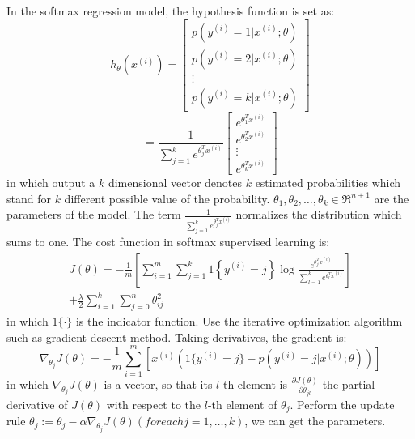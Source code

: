 \documentclass[journal]{IEEEtran}
\begin{document}
In the softmax regression model, the hypothesis function is set as:
\begin{equation}
h_{\theta}(x^{(i)}) = 
\left[
      \begin{array}{cccccc}
        p(y^{(i)}=1|x^{(i)};\theta) \\
        p(y^{(i)}=2|x^{(i)};\theta) \\
        \vdots \\
        p(y^{(i)}=k|x^{(i)};\theta)
      \end{array}
    \right]
\end{equation}
\begin{equation}
= \frac{1}{\sum_{j=1}^ke^{\theta_j^Tx^{(i)}}}
\left[
      \begin{array}{cccccc}
        e^{\theta_1^Tx^{(i)}}\\
        e^{\theta_2^Tx^{(i)}}\\
        \vdots \\
        e^{\theta_k^Tx^{(i)}}
      \end{array}
    \right]
\end{equation}
in which output a $k$ dimensional vector denotes $k$ estimated probabilities which stand for $k$ different possible value of the probability. $\theta_1, \theta_2, \ldots, \theta_k \in \Re^{n+1}$ are the parameters of the model. The term $\frac{1}{ \sum_{j=1}^{k}{e^{ \theta_j^T x^{(i)} }} }$  normalizes the distribution which sums to one. The cost function in softmax supervised learning is:
\begin{equation}
\begin{split}
J(\theta) = - \frac{1}{m} \left[ \sum_{i=1}^{m} \sum_{j=1}^{k} 1\left\{y^{(i)} = j\right\} \log \frac{e^{\theta_j^T x^{(i)}}}{\sum_{l=1}^k e^{ \theta_l^T x^{(i)} }}  \right] \\
              + \frac{\lambda}{2} \sum_{i=1}^k \sum_{j=0}^n \theta_{ij}^2
\end{split}
\end{equation}
in which $1\{\cdot\}$ is the indicator function.
Use the iterative optimization algorithm such as gradient descent method. Taking derivatives, the gradient is:
\begin{equation}
\nabla_{\theta_j} J(\theta) = - \frac{1}{m} \sum_{i=1}^{m}{ [ x^{(i)} ( 1\{ y^{(i)} = j\}  - p(y^{(i)} = j | x^{(i)}; \theta) ) ]}
\end{equation}
in which  $\nabla_{\theta_j} J(\theta)$ is a vector, so that its $l$-th element is $\frac{\partial J(\theta)}{\partial \theta_{jl}}$ the partial derivative of $J(\theta)$ with respect to the $l$-th element of $\theta_j$.
Perform the update rule $\theta_j := \theta_j - \alpha \nabla_{\theta_j} J(\theta) (for each j=1,\ldots,k)$, we can get the parameters.
\end{document}
